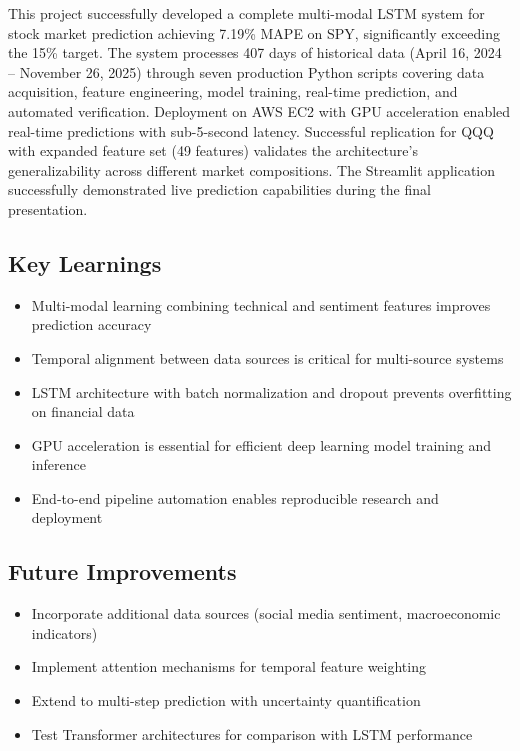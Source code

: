 \documentclass[12pt,letterpaper]{article}
\begin{document}
This project successfully developed a complete multi-modal LSTM system for stock market prediction achieving 7.19\% MAPE on SPY, significantly exceeding the 15\% target. The system processes 407 days of historical data (April 16, 2024 -- November 26, 2025) through seven production Python scripts covering data acquisition, feature engineering, model training, real-time prediction, and automated verification. Deployment on AWS EC2 with GPU acceleration enabled real-time predictions with sub-5-second latency. Successful replication for QQQ with expanded feature set (49 features) validates the architecture's generalizability across different market compositions. The Streamlit application successfully demonstrated live prediction capabilities during the final presentation.

\subsection{Key Learnings}

\begin{itemize}[noitemsep]
    \item Multi-modal learning combining technical and sentiment features improves prediction accuracy
    \item Temporal alignment between data sources is critical for multi-source systems
    \item LSTM architecture with batch normalization and dropout prevents overfitting on financial data
    \item GPU acceleration is essential for efficient deep learning model training and inference
    \item End-to-end pipeline automation enables reproducible research and deployment
\end{itemize}

\subsection{Future Improvements}

\begin{itemize}[noitemsep]
    \item Incorporate additional data sources (social media sentiment, macroeconomic indicators)
    \item Implement attention mechanisms for temporal feature weighting
    \item Extend to multi-step prediction with uncertainty quantification
    \item Test Transformer architectures for comparison with LSTM performance
\end{itemize}
\end{document}
